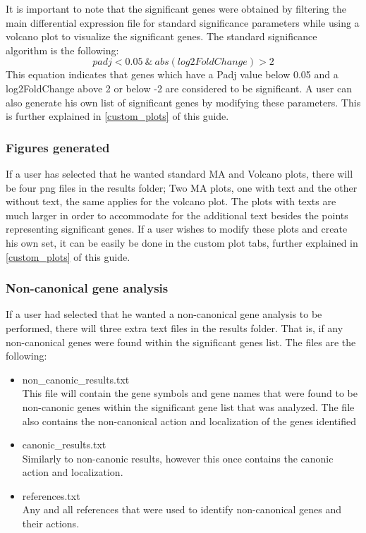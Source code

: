 \documentclass[11pt]{article}
\begin{document}
It is important to note that the significant genes were obtained by filtering the main differential expression file for standard significance parameters while using a volcano plot to visualize the significant genes. The standard significance algorithm is the following:
\[padj<0.05 \ \&\ abs(log2FoldChange)>2\]
This equation indicates that genes which have a Padj value below 0.05 and a log2FoldChange above 2 or below -2 are considered to be significant. A user can also generate his own list of significant genes by modifying these parameters. This is further explained in \autoref{custom_plots} of this guide.

\subsubsection{Figures generated}
If a user has selected that he wanted standard MA and Volcano plots, there will be four png files in the results folder; Two MA plots, one with text and the other without text, the same applies for the volcano plot.
The plots with texts are much larger in order to accommodate for the additional text besides the points representing significant genes.
If a user wishes to modify these plots and create his own set, it can be easily be done in the custom plot tabs, further explained in \autoref{custom_plots} of this guide.

\subsubsection{Non-canonical gene analysis}
If a user had selected that he wanted a non-canonical gene analysis to be performed, there will three extra text files in the results folder. That is, if any non-canonical genes were found within the significant genes list. The files are the following: 
\begin{itemize}
\item non\_canonic\_results.txt\\
This file will contain the gene symbols and gene names that were found to be non-canonic genes within the significant gene list that was analyzed. The file also contains the non-canonical action and localization of the genes identified
\item canonic\_results.txt\\
Similarly to non-canonic results, however this once contains the canonic action and localization.
\item references.txt\\
Any and all references that were used to identify non-canonical genes and their actions.
\end{itemize}
\end{document}
